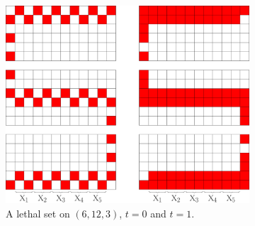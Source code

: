 \begin{figure}[]
\centering
\begin{subfigure}{0.65\textwidth}
\includegraphics[width=\textwidth]{figures/7/6x12x3.pdf}
\caption{A lethal set on $(6,12,3)$, $t=0$ and $t=1$.}
\label{fig:6x12x3}	
\end{subfigure} \hfill%
\begin{subfigure}{0.2915\textwidth}

\end{subfigure}
\end{figure}
